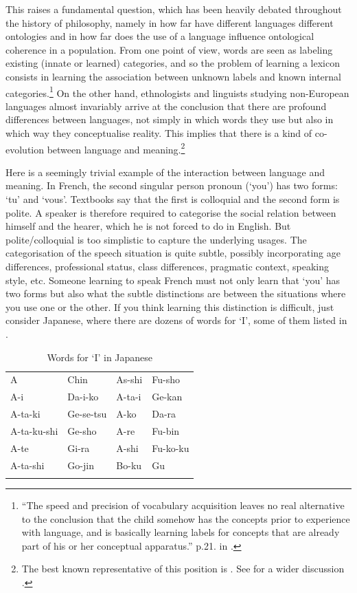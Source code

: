 This raises a fundamental question, which has been
heavily debated throughout the history of 
philosophy, namely in how far have different languages
different ontologies and in how far does the use of a 
language influence ontological coherence in 
a population. From one point of view, words are seen as labeling 
existing (innate or learned) categories, and so the problem
of learning a lexicon consists in learning 
the association between unknown labels and 
known internal categories.\footnote{
``The speed and precision of vocabulary acquisition 
leaves no real alternative to the conclusion that the 
child somehow has the concepts prior to 
experience with language, and is basically learning 
labels for concepts that are already part of his or 
her conceptual apparatus.'' p.21. in \cite{Chomsky:1987}.}
On the other hand, ethnologists and linguists studying 
non-European languages almost invariably arrive at the 
conclusion that there are profound differences between 
languages, not simply in which words they use but also 
in which way they conceptualise reality. This implies
that there is a kind of co-evolution between language
and meaning.\footnote{The best known representative of 
this position is \cite{Whorf:1956}. 
See for a wider discussion \cite{Lee:1996}.}

Here is a seemingly trivial example of the interaction 
between language and meaning. In French, the second singular person
pronoun (`you') has two forms: 
`tu' and `vous'. Textbooks say that the first is colloquial 
and the second form is polite. A speaker is therefore
required to categorise the social relation between himself
and the hearer, which he is not forced to do in English. 
But polite/colloquial is too simplistic to capture the 
underlying usages. The categorisation of the speech 
situation is quite subtle, possibly incorporating
age differences, professional status, 
class differences, pragmatic context, speaking 
style, etc. Someone learning to speak French must not 
only learn that `you' has two forms but also what the 
subtle distinctions are between the situations where 
you use one or the other. If you think learning this distinction
is difficult, just consider Japanese, where there are 
dozens of words for `I', some of them listed in .


\begin{table} 
\caption{Words for `I' in Japanese}
\label{tab:7:japanese}
\begin{tabular}{llll}
\lsptoprule
A            &  Chin       &      As-shi    &        Fu-sho\\
A-i          &  Da-i-ko    &      A-ta-i    &        Ge-kan\\
A-ta-ki      &  Ge-se-tsu  &      A-ko      &        Da-ra\\
A-ta-ku-shi  &  Ge-sho     &      A-re      &        Fu-bin\\
A-te         &  Gi-ra      &      A-shi     &        Fu-ko-ku\\
A-ta-shi     &  Go-jin     &      Bo-ku     &        Gu           \\
\lspbottomrule
\end{tabular}
\end{table}

